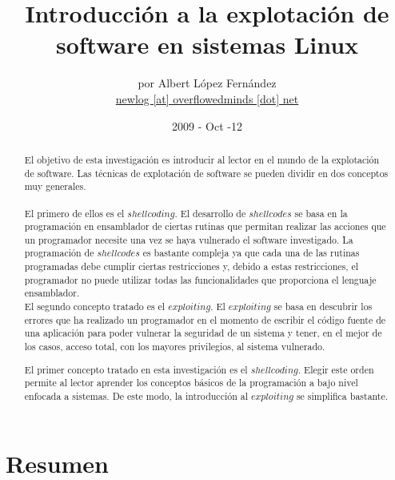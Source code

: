 \documentclass [titlepage, 12pt]{article}
\title {Introducci\'on a la explotaci\'on de software en sistemas Linux}
\author {por Albert L\'opez Fern\'andez \\ \url{newlog [at] overflowedminds [dot] net}}
\date {2009 - Oct -12}
\begin{document}
\renewcommand{\listtablename}{\'Indice de tablas}
\renewcommand{\tablename}{Tabla}
\renewcommand{\refname}{Bibliograf\'ia}
\renewcommand{\abstractname}{Abstract}

\maketitle
\newpage

\begin{abstract}
El objetivo de esta investigaci\'on es introducir al lector en el mundo de la explotaci\'on de software. Las t\'ecnicas de explotaci\'on de software se pueden dividir en dos conceptos muy generales. \\
\\
El primero de ellos es el $shellcoding$. El desarrollo de $shellcodes$ se basa en la programaci\'on en ensamblador de ciertas rutinas que permitan realizar las acciones que un programador necesite una vez se haya vulnerado el software investigado. La programaci\'on de $shellcodes$ es bastante compleja ya que cada una de las rutinas programadas debe cumplir ciertas restricciones y, debido a estas restricciones, el programador no puede utilizar todas las funcionalidades que proporciona el lenguaje ensamblador. \\
El segundo concepto tratado es el $exploiting$. El $exploiting$ se basa en descubrir los errores que ha realizado un programador en el momento de escribir el c\'odigo fuente de una aplicaci\'on para poder vulnerar la seguridad de un sistema y tener, en el mejor de los casos, acceso total, con los mayores privilegios, al sistema vulnerado.\bigskip

El primer concepto tratado en esta investigaci\'on es el $shellcoding$. Elegir este orden permite al lector aprender los conceptos b\'asicos de la programaci\'on a bajo nivel enfocada a sistemas. De este modo, la introducci\'on al $exploiting$ se simplifica bastante.
\end{abstract}

\pagebreak

\section*{Resumen}
\thispagestyle{empty}
\end{document}
